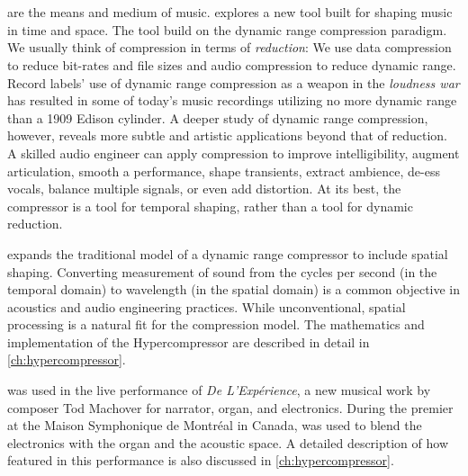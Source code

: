 \section{\thesis}
\label{sec:hypercompression-intro}
 are the means and medium of music. \thesis
explores a new tool built for shaping music in time and space. The
tool build on the dynamic range compression paradigm.  We usually
think of compression in terms of \emph{reduction}: We use data
compression to reduce bit-rates and file sizes and audio compression
to reduce dynamic range. Record labels' use of dynamic range
compression as a weapon in the \emph{loudness
  war}\cite{Deruty2014a} has resulted in some of today's music
recordings utilizing no more dynamic range than a 1909 Edison
cylinder.\cite{Katz2007} A deeper study of dynamic range compression,
however, reveals more subtle and artistic applications beyond that of
reduction. A skilled audio engineer can apply compression to improve
intelligibility, augment articulation, smooth a performance, shape
transients, extract ambience, de-ess vocals, balance multiple signals,
or even add distortion.\cite{Case2007} At its best, the compressor is
a tool for temporal shaping, rather than a tool for dynamic reduction.

\thesis expands the traditional model of a dynamic range compressor to
include spatial shaping.  Converting measurement of sound from the
cycles per second (in the temporal domain) to wavelength (in the
spatial domain) is a common objective in acoustics and audio
engineering practices.\cite{Davis1989} While unconventional, spatial
processing is a natural fit for the compression model. The mathematics
and implementation of the Hypercompressor are described in detail in
\autoref{ch:hypercompressor}.

\thesis was used in the live performance of \textit{De
  L'Exp\'{e}rience}, a new musical work by composer Tod Machover for
narrator, organ, and electronics. During the premier at the Maison
Symphonique de Montr\'{e}al in Canada, \thesis was used to blend the
electronics with the organ and the acoustic space. 
A detailed description of how \thesis featured in this performance is
also discussed in \autoref{ch:hypercompressor}.


